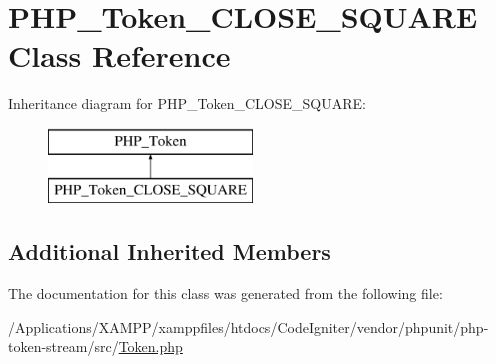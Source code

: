 \hypertarget{class_p_h_p___token___c_l_o_s_e___s_q_u_a_r_e}{}\section{P\+H\+P\+\_\+\+Token\+\_\+\+C\+L\+O\+S\+E\+\_\+\+S\+Q\+U\+A\+RE Class Reference}
\label{class_p_h_p___token___c_l_o_s_e___s_q_u_a_r_e}
Inheritance diagram for P\+H\+P\+\_\+\+Token\+\_\+\+C\+L\+O\+S\+E\+\_\+\+S\+Q\+U\+A\+RE\+:\begin{figure}[H]
\begin{center}
\leavevmode
\includegraphics[height=2.000000cm]{class_p_h_p___token___c_l_o_s_e___s_q_u_a_r_e}
\end{center}
\end{figure}
\subsection*{Additional Inherited Members}


The documentation for this class was generated from the following file\+:\begin{DoxyCompactItemize}
\item 
/\+Applications/\+X\+A\+M\+P\+P/xamppfiles/htdocs/\+Code\+Igniter/vendor/phpunit/php-\/token-\/stream/src/\mbox{\hyperlink{_token_8php}{Token.\+php}}\end{DoxyCompactItemize}
